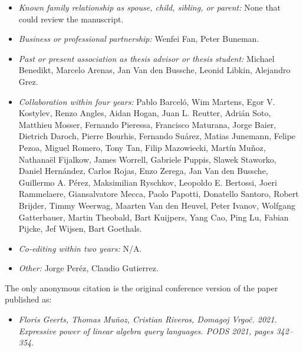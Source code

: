 \documentclass[11pt]{letter}
\begin{document}
\begin{itemize}\itemsep=-1pt
\item {\em Known family relationship as spouse, child, sibling, or parent:} None that could review the manuscript.
\item {\em Business or professional partnership:} Wenfei Fan, Peter Buneman.
\item {\em Past or present association as thesis advisor or thesis student:} Michael Benedikt, Marcelo Arenas, Jan Van den Bussche, Leonid Libkin, Alejandro Grez.
\item {\em Collaboration within four years:} Pablo Barcel\'o, Wim Martens, Egor V. Kostylev, Renzo Angles, Aidan Hogan, Juan L. Reutter, Adri\'an Soto, Matthieu Mosser, Fernando Pieressa, Francisco Maturana, Jorge Baier, Dietrich Daroch, Pierre Bourhis, Fernando Su\'arez, Matias Junemann, Felipe Pezoa, Miguel Romero, Tony Tan, Filip Mazowiecki, Mart\'in Mu\~noz, Nathana\"el Fijalkow, James Worrell, Gabriele Puppis,  Slawek Staworko, Daniel Hern\'andez, Carlos Rojas, Enzo Zerega,  Jan Van den Bussche, Guillermo A. P\'erez, Maksimilian Ryschkov, Leopoldo E. Bertossi, Joeri Rammelaere, Giansalvatore Mecca, Paolo Papotti, Donatello Santoro, Robert Brijder, Timmy Weerwag, Maarten Van den Heuvel, Peter Ivanov, Wolfgang Gatterbauer, Martin Theobald, Bart Kuijpers, Yang Cao, Ping Lu, Fabian Pijcke, Jef Wijsen, Bart Goethals.
\item {\em Co-editing within two years:} N/A.
\item {\em Other:} Jorge Per\'ez, Claudio Gutierrez.
\end{itemize}

\medskip

 The only anonymous citation is the original conference version of the paper published as:
\begin{itemize}
\item {\em Floris Geerts, Thomas Mu\~noz, Cristian Riveros,  Domagoj Vrgo\v{c}. 2021. 
Expressive power of linear algebra query languages. PODS 2021, pages 342--354}.
\end{itemize}
\end{document}
